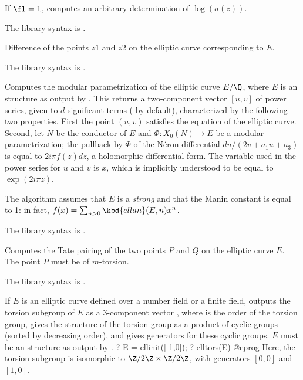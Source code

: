 If $\fl=1$, computes an arbitrary determination of $\log(\sigma(z))$.

The library syntax is .

\label{se:ellsub}
Difference of the points $z1$ and $z2$ on the
elliptic curve corresponding to $E$.

The library syntax is .

\label{se:elltaniyama}
Computes the modular parametrization of the elliptic curve $E/\Q$,
where $E$ is an  structure as output by . This returns
a two-component vector $[u,v]$ of power series, given to $d$ significant
terms ( by default), characterized by the following two
properties. First the point $(u,v)$ satisfies the equation of the elliptic
curve. Second, let $N$ be the conductor of $E$ and $\Phi: X_0(N)\to E$
be a modular parametrization; the pullback by $\Phi$ of the
N\'eron differential $du/(2v+a_1u+a_3)$ is equal to $2i\pi
f(z)dz$, a holomorphic differential form. The variable used in the power
series for $u$ and $v$ is $x$, which is implicitly understood to be equal to
$\exp(2i\pi z)$.

The algorithm assumes that $E$ is a \emph{strong} 
and that the Manin constant is equal to 1: in fact, $f(x) = \sum_{n > 0}
\kbd{ellan}(E, n) x^n$.

The library syntax is .

\label{se:elltatepairing}
Computes the Tate pairing of the two points $P$ and $Q$ on the elliptic
curve $E$. The point $P$ must be of $m$-torsion.

The library syntax is .

\label{se:elltors}
If $E$ is an elliptic curve defined over a number field or a finite field,
outputs the torsion subgroup of $E$ as a 3-component vector \kbd{[t,v1,v2]},
where  is the order of the torsion group,  gives the structure
of the torsion group as a product of cyclic groups (sorted by decreasing
order), and  gives generators for these cyclic groups. $E$ must be an
 structure as output by .
\bprog
?  E = ellinit([-1,0]);
?  elltors(E)
@eprog\noindent
Here, the torsion subgroup is isomorphic to $\Z/2\Z \times \Z/2\Z$, with
generators $[0,0]$ and $[1,0]$.

